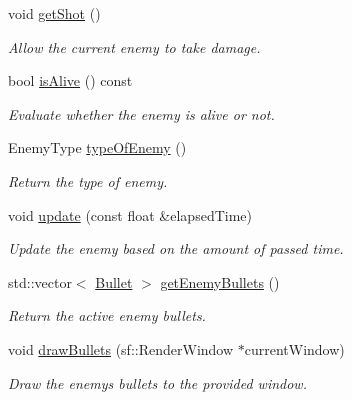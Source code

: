 \begin{DoxyCompactItemize}
\mbox{\label{class_enemy_a2faee7be0abbf8d473ecd6d7ee084e60}} 
void \hyperlink{class_enemy_a2faee7be0abbf8d473ecd6d7ee084e60}{get\+Shot} ()
\begin{DoxyCompactList}\small\item\em Allow the current enemy to take damage. \end{DoxyCompactList}\item 
\mbox{\label{class_enemy_a2801f42818600b19a7381dd2d1635af8}} 
bool \hyperlink{class_enemy_a2801f42818600b19a7381dd2d1635af8}{is\+Alive} () const
\begin{DoxyCompactList}\small\item\em Evaluate whether the enemy is alive or not. \end{DoxyCompactList}\item 
\mbox{\label{class_enemy_a7d8b3efe6d46b3c77446fe7f2a282a19}} 
Enemy\+Type \hyperlink{class_enemy_a7d8b3efe6d46b3c77446fe7f2a282a19}{type\+Of\+Enemy} ()
\begin{DoxyCompactList}\small\item\em Return the type of enemy. \end{DoxyCompactList}\item 
void \hyperlink{class_enemy_a541b72a32e4a0217d58d1ee573c2f23a}{update} (const float \&elapsed\+Time)
\begin{DoxyCompactList}\small\item\em Update the enemy based on the amount of passed time. \end{DoxyCompactList}\item 
\mbox{\label{class_enemy_a849b23a3f78625911b0969506426d4da}} 
std\+::vector$<$ \hyperlink{class_bullet}{Bullet} $>$ \hyperlink{class_enemy_a849b23a3f78625911b0969506426d4da}{get\+Enemy\+Bullets} ()
\begin{DoxyCompactList}\small\item\em Return the active enemy bullets. \end{DoxyCompactList}\item 
void \hyperlink{class_enemy_ac0e1068fc766428d69d55b18e0fce0ca}{draw\+Bullets} (sf\+::\+Render\+Window $\ast$current\+Window)
\begin{DoxyCompactList}\small\item\em Draw the enemy\textquotesingle{}s bullets to the provided window. \end{DoxyCompactList}\item 

\end{DoxyCompactItemize}
